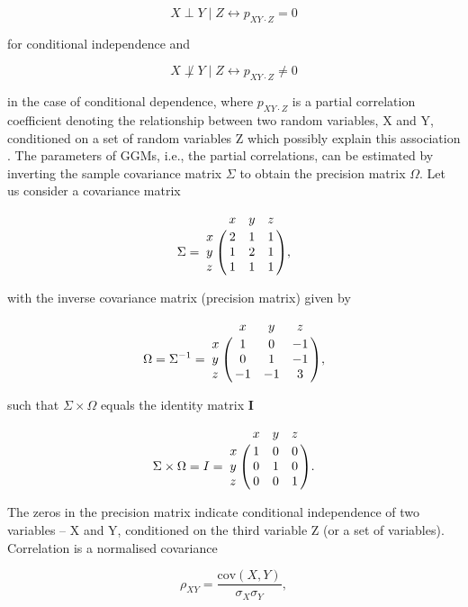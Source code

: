 \documentclass[
	a4paper, %
	10pt, %
	unnumberedsections, %
	twoside, %
]{LTJournalArticle}
\begin{document}
\begin{equation} \label{eq:S1}
X \perp Y \mid Z \leftrightarrow p_{XY \cdot Z} = 0
\end{equation}
	
\noindent for conditional independence and

\begin{equation} \label{eq:S2}
X \not\perp Y \mid Z \leftrightarrow p_{XY \cdot Z} \neq 0
\end{equation}

\noindent in the case of conditional dependence, where \( p_{XY \cdot Z} \) 
is a partial correlation 
coefficient denoting the relationship between two random variables, X and Y, 
conditioned on a set 
of random variables Z which possibly explain this association \autocite{altenbuchinger2020a}. 
The parameters of GGMs, i.e., the partial correlations, can be 
estimated by inverting the sample covariance matrix \( \Sigma \) to obtain the 
precision matrix \( \Omega \). 
Let us consider a covariance matrix

\begin{equation} 
    \label{eq:S3}
    \Sigma = 
    \bordermatrix{~ & x & y & z \cr
        x & 2 & 1 & 1 \cr
        y & 1 & 2 & 1 \cr
        z & 1 & 1 & 1 \cr
    },
\end{equation}

\noindent with the inverse covariance matrix (precision matrix) given by

\begin{equation} 
    \label{eq:S4}
    \Omega = \Sigma^{-1} = 
    \bordermatrix{~ & x & y & z \cr
        x & 1 & 0 & -1 \cr
        y & 0 & 1 & -1 \cr
        z & -1 & -1 & 3 \cr
    },
\end{equation}

\noindent such that $\Sigma \times \Omega$ equals the identity matrix $\mathbf{I}$


\begin{equation} 
    \label{eq:S5}
    \Sigma \times \Omega = I = 
    \bordermatrix{~ & x & y & z \cr
        x & 1 & 0 & 0 \cr
        y & 0 & 1 & 0 \cr
        z & 0 & 0 & 1 \cr
	}.
\end{equation}

\noindent The zeros in the precision matrix indicate conditional independence 
of two variables – X and Y, 
conditioned on the third variable Z (or a set of variables). 
Correlation is a normalised covariance 
\autocite{baba2004a}

\begin{equation} \label{eq:S6}
    \rho_{XY} = \frac{\text{cov}(X, Y)}{\sigma_X \sigma_Y},
\end{equation}
\end{document}
